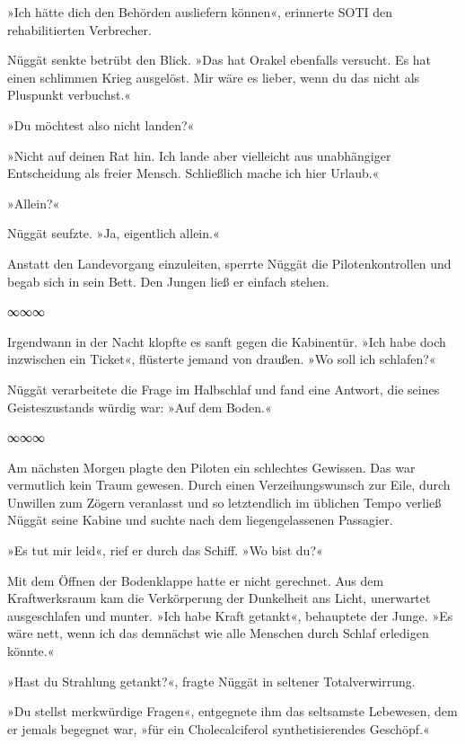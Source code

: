 »Ich hätte dich den Behörden ausliefern können«, erinnerte SOTI den rehabilitierten Verbrecher.

Nüggät senkte betrübt den Blick. »Das hat Orakel ebenfalls versucht. Es hat einen schlimmen Krieg ausgelöst. Mir wäre es lieber, wenn du das nicht als Pluspunkt verbuchst.«

»Du möchtest also nicht landen?«

»Nicht auf deinen Rat hin. Ich lande aber vielleicht aus unabhängiger Entscheidung als freier Mensch. Schließlich mache ich hier Urlaub.«

»Allein?«

Nüggät seufzte. »Ja, eigentlich allein.«

Anstatt den Landevorgang einzuleiten, sperrte Nüggät die Pilotenkontrollen und begab sich in sein Bett. Den Jungen ließ er einfach stehen.

\begin{center}
∞∞∞
\end{center}

Irgendwann in der Nacht klopfte es sanft gegen die Kabinentür. »Ich habe doch inzwischen ein Ticket«, flüsterte jemand von draußen. »Wo soll ich schlafen?«

Nüggät verarbeitete die Frage im Halbschlaf und fand eine Antwort, die seines Geisteszustands würdig war: »Auf dem Boden.«

\begin{center}
∞∞∞
\end{center}

Am nächsten Morgen plagte den Piloten ein schlechtes Gewissen. Das war vermutlich kein Traum gewesen. Durch einen Verzeihungswunsch zur Eile, durch Unwillen zum Zögern veranlasst und so letztendlich im üblichen Tempo verließ Nüggät seine Kabine und suchte nach dem liegengelassenen Passagier.

»Es tut mir leid«, rief er durch das Schiff. »Wo bist du?«

Mit dem Öffnen der Bodenklappe hatte er nicht gerechnet. Aus dem Kraftwerksraum kam die Verkörperung der Dunkelheit ans Licht, unerwartet ausgeschlafen und munter. »Ich habe Kraft getankt«, behauptete der Junge. »Es wäre nett, wenn ich das demnächst wie alle Menschen durch Schlaf erledigen könnte.«

»Hast du Strahlung getankt?«, fragte Nüggät in seltener Totalverwirrung.

»Du stellst merkwürdige Fragen«, entgegnete ihm das seltsamste Lebewesen, dem er jemals begegnet war, »für ein Cholecalciferol synthetisierendes Geschöpf.«

